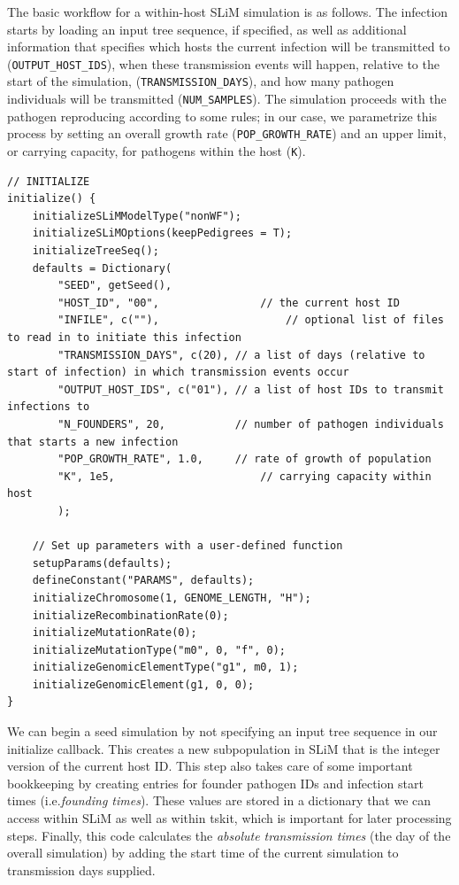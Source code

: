 \documentclass[12pt]{article}
\newcommand*{\ie}{i.e.\xcomma}
\begin{document}
The basic workflow for a within-host SLiM simulation is as follows. The infection starts by loading an input tree sequence, if specified,
as well as additional information that specifies which hosts the current infection will be transmitted to (\verb|OUTPUT_HOST_IDS|),
when these transmission events will happen, relative to the start of the simulation, (\verb|TRANSMISSION_DAYS|),
and how many pathogen individuals will be transmitted (\verb|NUM_SAMPLES|).
The simulation proceeds with the pathogen reproducing according
to some rules; in our case, we parametrize this process by setting an overall growth rate (\verb|POP_GROWTH_RATE|)
and an upper limit, or carrying capacity, for pathogens within the host (\verb|K|).

\begin{lstlisting}[language=slim, style=slimstyle, breaklines=true]
// INITIALIZE
initialize() {
	initializeSLiMModelType("nonWF");
	initializeSLiMOptions(keepPedigrees = T);
	initializeTreeSeq();
	defaults = Dictionary(
		"SEED", getSeed(),
		"HOST_ID", "00", 				// the current host ID
		"INFILE", c(""),					// optional list of files to read in to initiate this infection
		"TRANSMISSION_DAYS", c(20),	// a list of days (relative to start of infection) in which transmission events occur
		"OUTPUT_HOST_IDS", c("01"),	// a list of host IDs to transmit infections to
		"N_FOUNDERS", 20,			// number of pathogen individuals that starts a new infection
		"POP_GROWTH_RATE", 1.0,		// rate of growth of population
		"K", 1e5,						// carrying capacity within host
		);
	
	// Set up parameters with a user-defined function
	setupParams(defaults);
	defineConstant("PARAMS", defaults);
	initializeChromosome(1, GENOME_LENGTH, "H");
	initializeRecombinationRate(0);
	initializeMutationRate(0);
	initializeMutationType("m0", 0, "f", 0);
	initializeGenomicElementType("g1", m0, 1);
	initializeGenomicElement(g1, 0, 0);
}
\end{lstlisting}

We can begin a seed simulation by not specifying an input tree sequence in our initialize callback. This creates a new subpopulation in SLiM that is the integer version of the
current host ID. This step also takes care of some important bookkeeping by creating entries for founder pathogen IDs and infection start times (\ie \textit{founding times}). These
values are stored in a dictionary that we can access within SLiM as well as within tskit, which is important for later processing steps.
Finally, this code
calculates the \textit{absolute transmission times} (the day of the overall simulation) by adding the start time of the current simulation to transmission days supplied.
\end{document}
